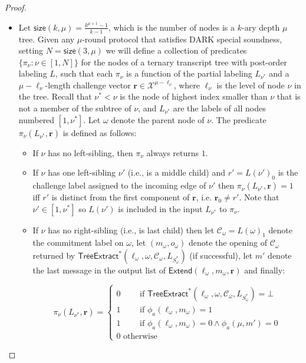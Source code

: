 \begin{proof}
\begin{itemize}
\item Let $\textsf{size}(k, \mu) = \frac{k^{\mu+1}-1}{k-1}$, which is the number of nodes is a $k$-ary depth $\mu$ tree. Given any $\mu$-round protocol that satisfies DARK special soundness, setting $N = \textsf{size}(3, \mu)$ we will define a collection of predicates $\{\pi_\nu: \nu \in [1,N]\}$ for the nodes of a ternary transcript tree with post-order labeling $L$, such that each $\pi_\nu$ is a function of the partial labeling $L_{\nu^*}$ and a $\mu - \ell_\nu$-length challenge vector $\mathbf{r} \in \mathcal{X}^{\mu - \ell_\nu}$, where $\ell_\nu$ is the level of node $\nu$ in the tree. Recall that $\nu^* < \nu$ is the node of highest index smaller than $\nu$ that is not a member of the subtree of $\nu$, and $L_{\nu^*}$ are the labels of all nodes numbered $[1, \nu^*]$. Let $\omega$ denote the parent node of $\nu$. The predicate $\pi_\nu(L_{\nu^*}, \mathbf{r})$ is defined as follows: 
\begin{itemize} 
\item If $\nu$ has no left-sibling, then $\pi_\nu$ always returns $1$. 
\item If $\nu$ has one left-sibling $\nu'$ (i.e., is a middle child) and $r' = L(\nu')_0$ is the challenge label assigned to the incoming edge of $\nu'$ then $\pi_\nu(L_{\nu^*}, \mathbf{r}) = 1$ iff $r'$ is distinct from the first component of $\mathbf{r}$, i.e. $\mathbf{r}_0 \neq r'$. Note that $\nu' \in [1, \nu^*]$ so $L(\nu')$ is included in the input $L_{\nu^*}$ to $\pi_\nu$. 
\item If $\nu$ has no right-sibling (i.e., is last child) then let $\mathcal{C}_\omega = L(\omega)_1$ denote the commitment label on $\omega$, let $(m_\omega, o_\omega)$ denote the opening of $\mathcal{C}_\omega$ returned by $\textsf{TreeExtract}^*(\ell_\omega, \omega, \mathcal{C}_\omega, L_{S^*_\omega})$ (if successful), let $m'$ denote the last message in the output list of $\textsf{Extend}(\ell_\omega, m_\omega,\mathbf{r})$ and finally: 

 $$\pi_\nu(L_{\nu^*}, \mathbf{r}) = 
 \begin{cases} 0 \quad\quad \text{ if }  \textsf{TreeExtract}^*(\ell_\omega, \omega, \mathcal{C}_\omega, L_{S^*_\omega}) = \bot \\ 
 1 \quad \quad \text{ if } \phi_a(\ell_\omega, m_\omega) = 1\\
 1 \quad \quad \text{ if } \phi_a(\ell_\omega, m_\omega) = 0 \wedge \phi_a(\mu, m') = 0 \\ 
0 \text{ otherwise} 
\end{cases} $$ 


\end{itemize}
\end{itemize}
\end{proof}
